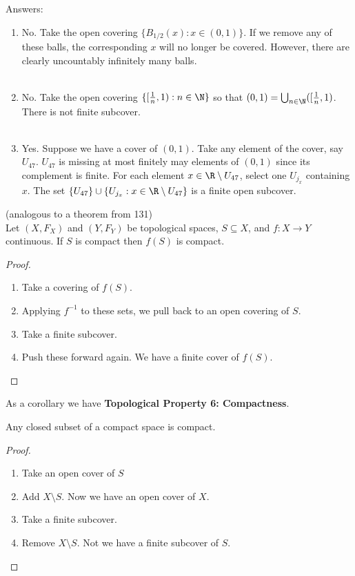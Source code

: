Answers:
\begin{enumerate}
\item No. Take the open covering $\{B_{1/2}(x) : x \in (0,1)\}$. If we remove any of these balls, the corresponding $x$ will no longer be covered. However, there are clearly uncountably infinitely many balls. \\\\
\item No. Take the open covering $\{[\frac{1}{n}, 1) : n \in \N\}$ so that $(0,1) = \bigcup_{n \in \N}([\frac{1}{n}, 1)$. There is not finite subcover. \\\\
\item Yes. Suppose we have a cover of $(0,1)$. Take any element of the cover, say $U_{47}$. $U_{47}$ is missing at most finitely may elements of $(0,1)$ since its complement is finite. For each element $x \in \R \setminus U_{47}$, select one $U_{j_x}$ containing $x$. The set $\{U_{47}\} \cup \{U_{j_x}: x \in \R \setminus U_{47}\}$ is a finite open subcover. 
\end{enumerate}

\begin{theorem} (analogous to a theorem from 131)\\
Let $(X, F_X)$ and $(Y, F_Y)$ be topological spaces, $S \subseteq X$, and $f : X \rightarrow Y$ continuous. If $S$ is compact then $f(S)$ is compact. 
\end{theorem}
\begin{proof}
\begin{enumerate}
\item Take a covering of $f(S)$. 
\item Applying $f^{-1}$ to these sets, we pull back to an open covering of $S$.
\item Take a finite subcover. 
\item Push these forward again. We have a finite cover of $f(S)$. 
\end{enumerate}
\end{proof}

As a corollary we have {\bf Topological Property 6: Compactness}.\\
\begin{theorem}
Any closed subset of a compact space is compact. 
\end{theorem}
\begin{proof}
\begin{enumerate}
\item Take an open cover of $S$
\item Add $X \setminus S$. Now we have an open cover of $X$. 
\item Take a finite subcover.
\item Remove $X \setminus S$. Not we have a finite subcover of $S$. 
\end{enumerate}
\end{proof}

